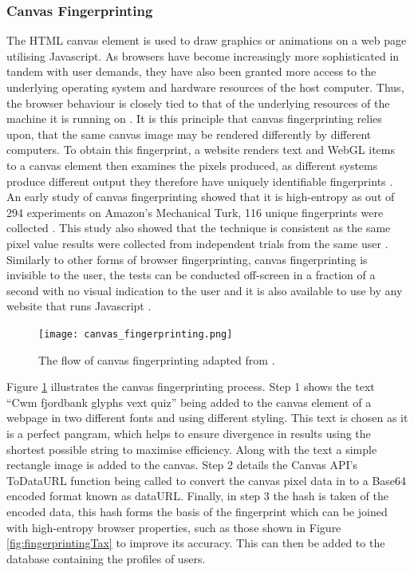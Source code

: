 \documentclass[12pt]{article}
\begin{document}
\subsubsection{Canvas Fingerprinting}
The HTML canvas element is used to draw graphics or animations on a web page utilising Javascript. As browsers have become increasingly more sophisticated in tandem with user demands, they have also been granted more access to the underlying operating system and hardware resources of the host computer. Thus, the browser behaviour is closely tied to that of the underlying resources of the machine it is running on \parencite{canvasFP}. It is this principle that canvas fingerprinting relies upon, that the same canvas image may be rendered differently by different computers. To obtain this fingerprint, a website renders text and WebGL items to a canvas element then examines the pixels produced, as different systems produce different output they therefore have uniquely identifiable fingerprints \parencite{canvasFP}. An early study of canvas fingerprinting showed that it is high-entropy as out of 294 experiments on Amazon's Mechanical Turk, 116 unique fingerprints were collected \parencite{canvasFP}. This study also showed that the technique is consistent as the same pixel value results were collected from independent trials from the same user \parencite{canvasFP}. Similarly to other forms of browser fingerprinting, canvas fingerprinting is invisible to the user, the tests can be conducted off-screen in a fraction of a second with no visual indication to the user and it is also available to use by any website that runs Javascript \parencite{canvasFP}. \\

\begin{figure}[H]
    \centering
    \texttt{[image: canvas\_fingerprinting.png]}
    \caption{The flow of canvas fingerprinting adapted from \parencite{webNeverForgets}.}
    \label{fig:canvas_fingerprinting}
\end{figure}

Figure \ref{fig:canvas_fingerprinting} illustrates the canvas fingerprinting process. Step 1 shows the text ``Cwm fjordbank glyphs vext quiz” being added to the canvas element of a webpage in two different fonts and using different styling. This text is chosen as it is a perfect pangram, which helps to ensure divergence in results using the shortest possible string to maximise efficiency. Along with the text a simple rectangle image is added to the canvas. Step 2 details the Canvas API’s ToDataURL function being called to convert the canvas pixel data in to a Base64 encoded format known as dataURL. Finally, in step 3 the hash is taken of the encoded data, this hash forms the basis of the fingerprint which can be joined with high-entropy browser properties, such as those shown in Figure \ref{fig:fingerprintingTax} to improve its accuracy. This can then be added to the database containing the profiles of users. \\     
\end{document}
